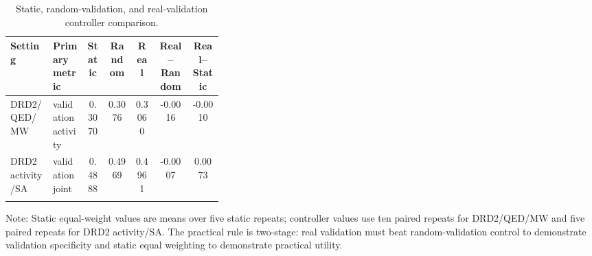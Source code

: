\begin{table}[!t]
\caption{Static, random-validation, and real-validation controller comparison.}
\label{tab:static_random_real}
\centering
\footnotesize
\setlength{\tabcolsep}{3pt}
\begin{tabularx}{\linewidth}{@{}p{0.20\linewidth}p{0.16\linewidth}ccccc@{}}
\toprule
Setting & Primary metric & Static & Random & Real & Real--Random & Real--Static\\
\midrule
DRD2/QED/MW & validation activity & 0.3070 & 0.3076 & 0.3060 & -0.0016 & -0.0010\\
DRD2 activity/SA & validation joint & 0.4888 & 0.4969 & 0.4961 & -0.0007 & 0.0073\\
\botrule
\end{tabularx}
\vspace{2pt}
\raggedright
\footnotesize
Note: Static equal-weight values are means over five static repeats; controller values use ten paired repeats for DRD2/QED/MW and five paired repeats for DRD2 activity/SA. The practical rule is two-stage: real validation must beat random-validation control to demonstrate validation specificity and static equal weighting to demonstrate practical utility.
\end{table}

